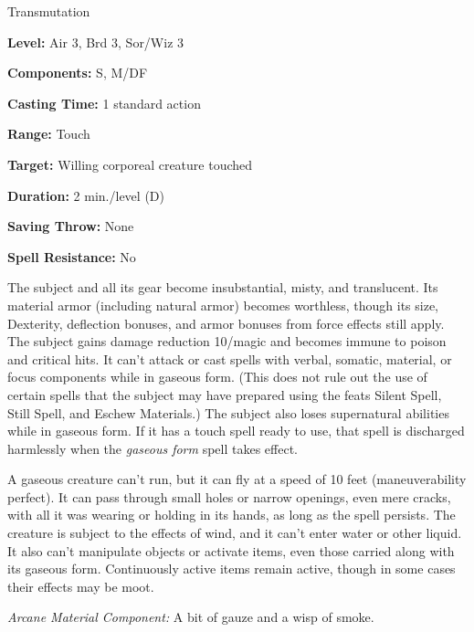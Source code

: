 
Transmutation

\textbf{Level:} Air 3, Brd 3, Sor/Wiz 3

\textbf{Components:} S, M/DF

\textbf{Casting Time:} 1 standard action

\textbf{Range:} Touch

\textbf{Target:} Willing corporeal creature touched

\textbf{Duration:} 2 min./level (D)

\textbf{Saving Throw:} None

\textbf{Spell Resistance:} No

The subject and all its gear become insubstantial, misty, and translucent. Its 
material armor (including natural armor) becomes worthless, though its size, Dexterity, 
deflection bonuses, and armor bonuses from force effects still apply. The subject 
gains damage reduction 10/magic and becomes immune to poison and critical hits. 
It can't attack or cast spells with verbal, somatic, material, or focus components 
while in gaseous form. (This does not rule out the use of certain spells that the 
subject may have prepared using the feats Silent Spell, Still Spell, and Eschew 
Materials.) The subject also loses supernatural abilities while in gaseous form. 
If it has a touch spell ready to use, that spell is discharged harmlessly when 
the \textit{gaseous form} spell takes effect.

A gaseous creature can't run, but it can fly at a speed of 10 feet (maneuverability 
perfect). It can pass through small holes or narrow openings, even mere cracks, 
with all it was wearing or holding in its hands, as long as the spell persists. 
The creature is subject to the effects of wind, and it can't enter water or other 
liquid. It also can't manipulate objects or activate items, even those carried 
along with its gaseous form. Continuously active items remain active, though in 
some cases their effects may be moot.

\textit{Arcane Material Component:} A bit of gauze and a wisp of smoke.

